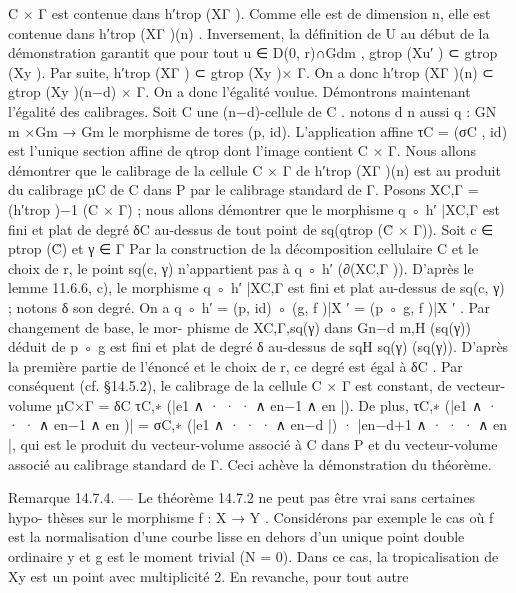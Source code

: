 \documentclass[
  10pt,
]{article}
\newenvironment{Shaded}{}{}
\newcommand{\NormalTok}[1]{#1}
\begin{document}
\begin{Shaded}
\begin{Highlighting}[]
\NormalTok{C × Γ est contenue dans h′trop (XΓ ). Comme elle est de dimension n, elle est contenue}
\NormalTok{dans h′trop (XΓ )(n) . Inversement, la définition de U au début de la démonstration garantit}
\NormalTok{que pour tout u ∈ D(0, r)∩Gdm , gtrop (Xu′ ) ⊂ gtrop (Xy ). Par suite, h′trop (XΓ ) ⊂ gtrop (Xy )×}
\NormalTok{Γ. On a donc h′trop (XΓ )(n) ⊂ gtrop (Xy )(n−d) × Γ. On a donc l’égalité voulue.}
\NormalTok{  Démontrons maintenant l’égalité des calibrages. Soit C une (n−d){-}cellule de C . notons}
\NormalTok{                   d        n}
\NormalTok{aussi q : GN m ×Gm → Gm le morphisme de tores (p, id). L’application affine τC = (σC , id)}
\NormalTok{est l’unique section affine de qtrop dont l’image contient C × Γ. Nous allons démontrer}
\NormalTok{que le calibrage de la cellule C × Γ de h′trop (XΓ )(n) est au produit du calibrage µC de C}
\NormalTok{dans P par le calibrage standard de Γ.}
\NormalTok{  Posons XC,Γ = (h′trop )−1 (C × Γ) ; nous allons démontrer que le morphisme q ◦ h′ |XC,Γ}
\NormalTok{est fini et plat de degré δC au{-}dessus de tout point de sq(qtrop (C̊ × Γ)).}
\NormalTok{  Soit c ∈ ptrop (C̊) et γ ∈ Γ Par la construction de la décomposition cellulaire C et le}
\NormalTok{choix de r, le point sq(c, γ) n’appartient pas à q ◦ h′ (∂(XC,Γ )). D’après le lemme 11.6.6,}
\NormalTok{c), le morphisme q ◦ h′ |XC,Γ est fini et plat au{-}dessus de sq(c, γ) ; notons δ son degré.}
\NormalTok{  On a q ◦ h′ = (p, id) ◦ (g, f )|X ′ = (p ◦ g, f )|X ′ . Par changement de base, le mor{-}}
\NormalTok{phisme de XC,Γ,sq(γ) dans Gn−d  m,H (sq(γ)) déduit de p ◦ g est fini et plat de degré δ au{-}dessus}
\NormalTok{de sqH sq(γ) (sq(γ)). D’après la première partie de l’énoncé et le choix de r, ce degré est}
\NormalTok{égal à δC .}
\NormalTok{  Par conséquent (cf. §14.5.2), le calibrage de la cellule C × Γ est constant, de vecteur{-}}
\NormalTok{volume}
\NormalTok{                              µC×Γ = δC τC,∗ (|e1 ∧ · · · ∧ en−1 ∧ en |).}
\NormalTok{De plus,}
\NormalTok{         τC,∗ (|e1 ∧ · · · ∧ en−1 ∧ en )| = σC,∗ (|e1 ∧ · · · ∧ en−d |) · |en−d+1 ∧ · · · ∧ en |,}
\NormalTok{qui est le produit du vecteur{-}volume associé à C dans P et du vecteur{-}volume associé}
\NormalTok{au calibrage standard de Γ. Ceci achève la démonstration du théorème.}

\NormalTok{Remarque 14.7.4. — Le théorème 14.7.2 ne peut pas être vrai sans certaines hypo{-}}
\NormalTok{thèses sur le morphisme f : X → Y .}
\NormalTok{   Considérons par exemple le cas où f est la normalisation d’une courbe lisse en dehors}
\NormalTok{d’un unique point double ordinaire y et g est le moment trivial (N = 0). Dans ce cas,}
\NormalTok{la tropicalisation de Xy est un point avec multiplicité 2. En revanche, pour tout autre}
\end{Highlighting}
\end{Shaded}
\end{document}
